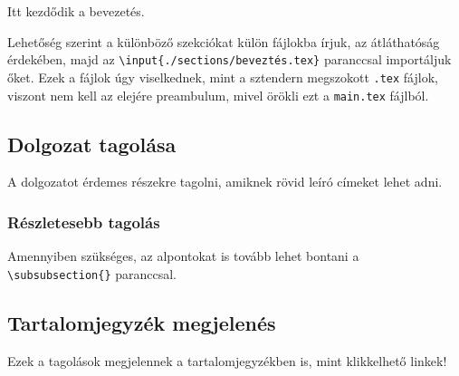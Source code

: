 Itt kezdődik a bevezetés.\par
Lehetőség szerint a különböző szekciókat külön fájlokba írjuk, az átláthatóság érdekében, majd az \texttt{\textbackslash input\{./sections/beveztés.tex\}} paranccsal importáljuk őket. Ezek a fájlok úgy viselkednek, mint a sztendern megszokott \texttt{.tex} fájlok, viszont nem kell az elejére preambulum, mivel örökli ezt a \texttt{main.tex} fájlból.

\subsection{Dolgozat tagolása}

A dolgozatot érdemes részekre tagolni, amiknek rövid leíró címeket lehet adni.

\subsubsection{Részletesebb tagolás}

Amennyiben szükséges, az alpontokat is tovább lehet bontani a \texttt{\textbackslash subsubsection\{\}} paranccsal.\par

\subsection{Tartalomjegyzék megjelenés}

Ezek a tagolások megjelennek a tartalomjegyzékben is, mint klikkelhető linkek!
